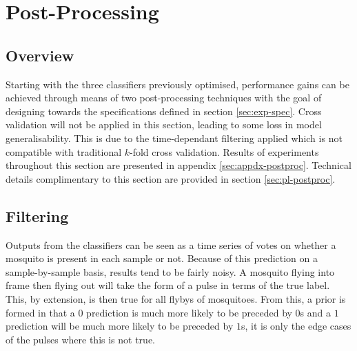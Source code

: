 \section{Post-Processing}
\label{sec:exp-postproc}
    \subsection{Overview}
    \label{subsec:exp-postproc-overview}
        Starting with the three classifiers previously optimised, performance gains can be achieved through means of two post-processing techniques with the goal of designing towards the specifications defined in section \ref{sec:exp-spec}. Cross validation will not be applied in this section, leading to some loss in model generalisability. This is due to the time-dependant filtering applied which is not compatible with traditional $k$-fold cross validation. Results of experiments throughout this section are presented in appendix \ref{sec:appdx-postproc}. Technical details complimentary to this section are provided in section \ref{sec:pl-postproc}.
    \subsection{Filtering}
    \label{subsec:exp-postproc-filt}
        Outputs from the classifiers can be seen as a time series of votes on whether a mosquito is present in each sample or not. Because of this prediction on a sample-by-sample basis, results tend to be fairly noisy. A mosquito flying into frame then flying out will take the form of a pulse in terms of the true label. This, by extension, is then true for all flybys of mosquitoes. From this, a prior is formed in that a $0$ prediction is much more likely to be preceded by $0$s and a $1$ prediction will be much more likely to be preceded by $1$s, it is only the edge cases of the pulses where this is not true. 
        
